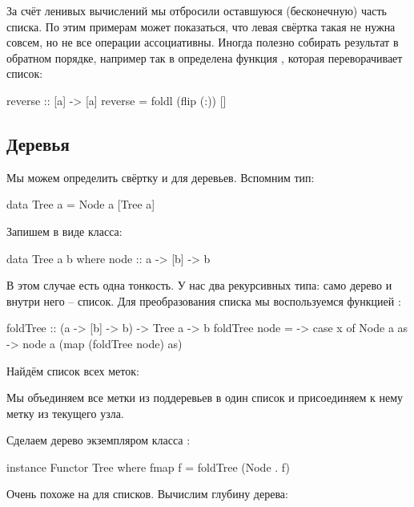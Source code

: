 За счёт ленивых вычислений мы отбросили оставшуюся
(бесконечную) часть списка. 
По этим примерам может показаться, что левая свёртка такая 
не нужна совсем, но не все операции ассоциативны. Иногда полезно собирать 
результат в обратном порядке, например так в 
определена функция , которая переворачивает
список:

\begin{code}
reverse :: [a] -> [a]
reverse = foldl (flip (:)) []
\end{code}

\subsection{Деревья}

Мы можем определить свёртку и для деревьев. Вспомним тип:

\begin{code}
data Tree a = Node a [Tree a]
\end{code}

Запишем в виде класса:

\begin{code}
data Tree a b where
    node :: a -> [b] -> b
\end{code}

В этом случае есть одна тонкость.
У нас два рекурсивных типа: само дерево и 
внутри него -- список. Для преобразования списка
мы воспользуемся функцией :

\begin{code}
foldTree :: (a -> [b] -> b) -> Tree a -> b
foldTree node = \x -> case x of
    Node a as -> node a (map (foldTree node) as)
\end{code}

Найдём список всех меток:


Мы объединяем все метки из поддеревьев в один список
и присоединяем к нему метку из текущего узла.

Сделаем дерево экземпляром класса :

\begin{code}
instance Functor Tree where
    fmap f = foldTree (Node . f)
\end{code}

Очень похоже на  для списков. Вычислим глубину
дерева:


